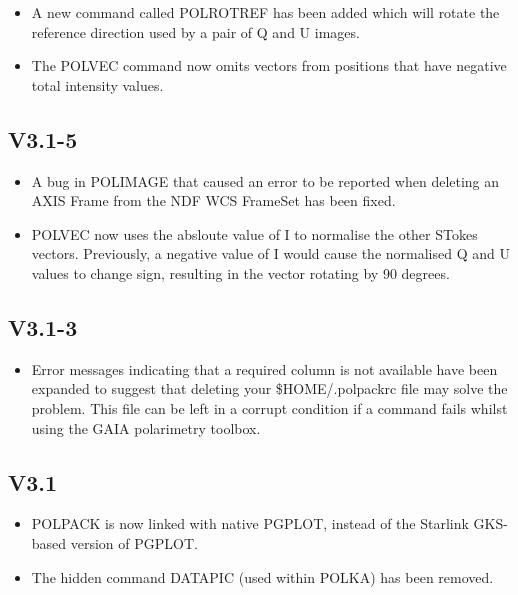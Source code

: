 \documentclass[twoside,11pt]{starlink}
\begin{document}
\begin{itemize}
 \item A new command called POLROTREF has been added which will rotate
 the reference direction used by a pair of Q and U images.
 \item The POLVEC command now omits vectors from positions that have
 negative total intensity values.
\end{itemize}


\subsection{V3.1-5}

\begin{itemize}
 \item A bug in POLIMAGE that caused an error to be reported when deleting
 an AXIS Frame from the NDF WCS FrameSet has been fixed.

 \item POLVEC now uses the absloute value of I to normalise the other STokes
 vectors. Previously, a negative value of I would cause the normalised Q
 and U values to change sign, resulting in the vector rotating by 90
 degrees.
\end{itemize}


\subsection{V3.1-3}

\begin{itemize}
 \item Error messages indicating that a required column is not available
 have been expanded to suggest that deleting your \$HOME/.polpackrc
 file may solve the problem. This file can be left in a corrupt condition
 if a command fails whilst using the GAIA polarimetry toolbox.

\end{itemize}

\subsection{V3.1}

\begin{itemize}
\item POLPACK is now linked with native PGPLOT, instead of the Starlink
GKS-based version of PGPLOT.

\item The hidden command DATAPIC (used within POLKA) has been removed.

\end{itemize}
\end{document}
